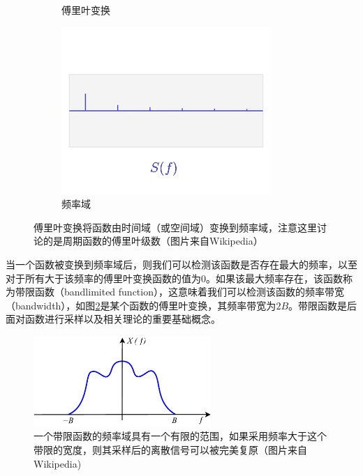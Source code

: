 \begin{figure}
\begin{fullwidth}
\begin{subfigure}[b]{0.33\thewidth}
		\caption{傅里叶变换}
	\end{subfigure}
	\begin{subfigure}[b]{0.33\thewidth}
		\includegraphics[width=1.\textwidth]{figures/intro/fourier-3}
		\caption{频率域}
	\end{subfigure}
\caption{傅里叶变换将函数由时间域（或空间域）变换到频率域，注意这里讨论的是周期函数的傅里叶级数（图片来自Wikipedia）}
\label{f:intro-fourier}
\end{fullwidth}
\end{figure}

当一个函数被变换到频率域后，则我们可以检测该函数是否存在最大的频率，以至对于所有大于该频率的傅里叶变换函数的值为$0$。如果该最大频率存在，该函数称为带限函数（bandlimited function），这意味着我们可以检测该函数的频率带宽（bandwidth），如图\ref{f:intro-fourier-case}是某个函数的傅里叶变换，其频率带宽为$2B$。带限函数是后面对函数进行采样以及相关理论的重要基础概念。

\begin{figure}
\sidecaption
	\includegraphics[width=0.6\textwidth]{figures/intro/Bandlimited}
	\caption{一个带限函数的频率域具有一个有限的范围，如果采用频率大于这个带限的宽度，则其采样后的离散信号可以被完美复原（图片来自Wikipedia)}
	\label{f:intro-fourier-case}
\end{figure}

